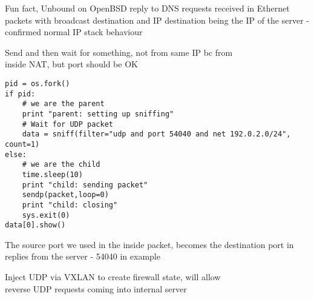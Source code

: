 \documentclass[Screen16to9,17pt]{foils}
\begin{document}
{\small Fun fact, Unbound on OpenBSD reply to DNS requests received in Ethernet packets with broadcast destination and IP destination being the IP of the server - confirmed normal IP stack behaviour}



Send and then wait for something, not from same IP bc from\\
inside NAT, but port should be OK
\begin{verbatim}
pid = os.fork()
if pid:
    # we are the parent
    print "parent: setting up sniffing"
    # Wait for UDP packet
    data = sniff(filter="udp and port 54040 and net 192.0.2.0/24", count=1)
else:
    # we are the child
    time.sleep(10)
    print "child: sending packet"
    sendp(packet,loop=0)
    print "child: closing"
    sys.exit(0)
data[0].show()
\end{verbatim}

The source port we used in the inside packet, becomes the destination port in replies from the server - 54040 in example



Inject UDP via VXLAN to create firewall state, will allow\\
reverse UDP requests coming into internal server

\end{document}
